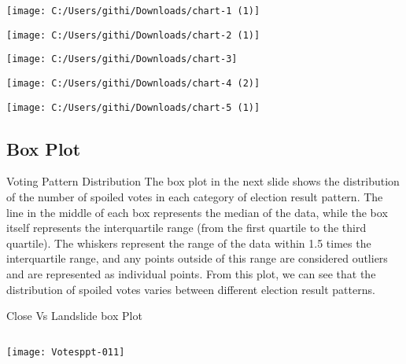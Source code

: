 \documentclass{beamer}
\begin{document}
\begin{frame}
  \centering
  \texttt{[image: C:/Users/githi/Downloads/chart-1 (1)]}
\end{frame}

\begin{frame}
  \centering
  \texttt{[image: C:/Users/githi/Downloads/chart-2 (1)]}
\end{frame}

\begin{frame}
  \centering
  \texttt{[image: C:/Users/githi/Downloads/chart-3]}
\end{frame}

\begin{frame}
  \centering
  \texttt{[image: C:/Users/githi/Downloads/chart-4 (2)]}
\end{frame}

\begin{frame}
  \centering
  \texttt{[image: C:/Users/githi/Downloads/chart-5 (1)]}
\end{frame}



\subsection{Box Plot}

\begin{frame}{Voting Pattern Distribution}
The box plot in the next slide shows the distribution of the number of spoiled votes in each category of election result pattern. The line in the middle of each box represents the median of the data, while the box itself represents the interquartile range (from the first quartile to the third quartile). The whiskers represent the range of the data within 1.5 times the interquartile range, and any points outside of this range are considered outliers and are represented as individual points.
From this plot, we can see that the distribution of spoiled votes varies between different election result patterns.
\end{frame}

\begin{frame}[fragile]{Close Vs Landslide box Plot}
\begin{columns}[c] %
\texttt{[image: Votesppt-011]}
\end{columns}
\end{frame}
\end{document}
